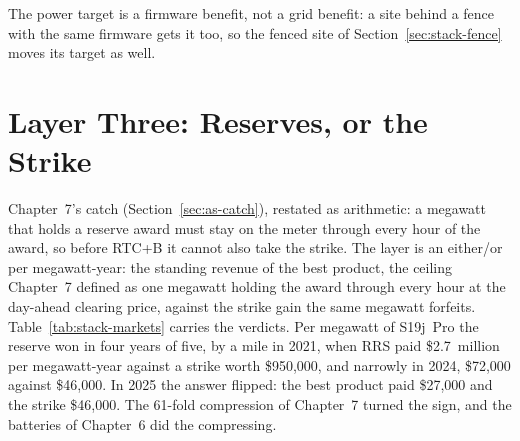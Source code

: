 The power target is a firmware benefit, not a grid benefit: a site behind a fence with the same firmware gets it too, so the fenced site of Section~\ref{sec:stack-fence} moves its target as well. %

\section{Layer Three: Reserves, or the Strike}
\label{sec:stack-reserves}

Chapter~7's catch (Section~\ref{sec:as-catch}), restated as arithmetic: a megawatt that holds a reserve award must stay on the meter through every hour of the award, so before RTC+B it cannot also take the strike. The layer is an either/or per megawatt-year: the standing revenue of the best product, the ceiling Chapter~7 defined as one megawatt holding the award through every hour at the day-ahead clearing price, against the strike gain the same megawatt forfeits. Table~\ref{tab:stack-markets} carries the verdicts. Per megawatt of S19j~Pro the reserve won in four years of five, by a mile in 2021, when RRS paid \$2.7~million per megawatt-year against a strike worth \$950,000, and narrowly in 2024, \$72,000 against \$46,000. In 2025 the answer flipped: the best product paid \$27,000 and the strike \$46,000. %
The 61-fold compression of Chapter~7 turned the sign, and the batteries of Chapter~6 did the compressing.

